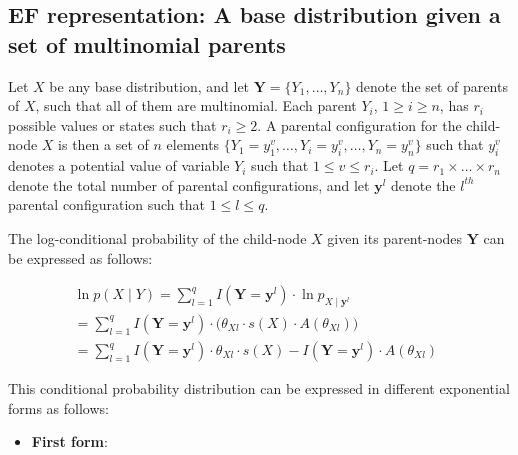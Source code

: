 \documentclass[11pt, oneside]{article}   	%
\numberwithin{figure}{section}
\numberwithin{equation}{section}
\numberwithin{table}{section}
\theoremstyle{definition}
\begin{document}
\begin{appendices}
\newpage
\section{EF representation: A base distribution given a set of multinomial parents}

Let $X$ be any base distribution, and let $\mathbf{Y} =\{Y_1,\ldots,Y_n\}$ denote the set of parents of $X$, such that all of them are multinomial. Each parent $Y_i$, $1 \geq i \geq n$, has $r_i$ possible values or states such that $r_i \geq 2$. A parental configuration for the child-node $X$ is then a set of $n$ elements $\{Y_1 = y_1^{v}, \ldots, Y_i = y_i^{v},\ldots, Y_n = y_n^{v} \}$ such that $y_i^{v}$ denotes a potential value of variable $Y_i$ such that  $1 \leq v \leq r_i$. Let $q = r_1 \times \ldots \times r_n$ denote the total number of parental configurations, and let $\mathbf{y}^l$ denote the $l^{th}$ parental configuration such that $1 \leq l \leq q$.

The log-conditional probability of the child-node $X$ given its parent-nodes $\mathbf{Y}$ can be expressed as follows:

\begin{eqnarray*}
\ln p(X \mid Y) =  \sum_{l=1}^q I(\mathbf{Y} =\mathbf{y}^l) \cdot \ln p_{X \mid \mathbf{y}^l} ~~~~~~~~~~~~~~~~~~~~~~~~~~~~~~~\\
= \sum_{l=1}^q I(\mathbf{Y} =\mathbf{y}^l) \cdot \Big(  \theta_{Xl}   \cdot  s(X)  \cdot  A(\theta_{Xl}) \Big)~~~~~~~~~~~~~\\
= \sum_{l=1}^q I(\mathbf{Y} =\mathbf{y}^l) \cdot \theta_{Xl} \cdot s(X) - I(\mathbf{Y} =\mathbf{y}^l) \cdot A(\theta_{Xl})
\end{eqnarray*}

This conditional probability distribution can be expressed in different exponential forms as follows:

\begin{itemize}

\item \textbf{First form}:


\end{itemize}
\end{appendices}
\end{document}
